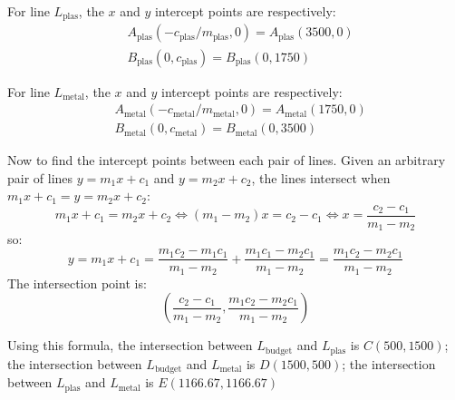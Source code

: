 \documentclass{article}
\begin{document}
For line \(L_\text{plas}\), the \(x\) and \(y\) intercept points are respectively: 
\begin{align*}
& A_\text{plas}(-c_\text{plas}/m_\text{plas}, 0) = A_\text{plas}(3500, 0)\\
& B_\text{plas}(0, c_\text{plas}) = B_\text{plas}(0, 1750)
\end{align*}

For line \(L_\text{metal}\), the \(x\) and \(y\) intercept points are respectively: 
\begin{align*}
& A_\text{metal}(-c_\text{metal}/m_\text{metal}, 0) = A_\text{metal}(1750, 0)\\
& B_\text{metal}(0, c_\text{metal}) = B_\text{metal}(0, 3500)
\end{align*}

\vspace{5mm}

Now to find the intercept points between each pair of lines. Given an arbitrary pair of lines \(y = m_1x + c_1\) and \(y = m_2x + c_2\), the lines intersect when \(m_1x + c_1 = y = m_2x + c_2\):
\[m_1x + c_1 = m_2x + c_2 \iff (m_1 - m_2)x = c_2 - c_1 \iff x = \frac{c_2 - c_1}{m_1 - m_2}\]
so:
\[y = m_1x + c_1 = \frac{m_1c_2 - m_1c_1}{m_1 - m_2} + \frac{m_1c_1 - m_2c_1}{m_1 - m_2} = \frac{m_1c_2 - m_2c_1}{m_1 - m_2}\]
The intersection point is:
\[\left(\frac{c_2 - c_1}{m_1 - m_2}, \frac{m_1c_2 - m_2c_1}{m_1 - m_2}\right)\] 

Using this formula, the intersection between \(L_\text{budget}\) and \(L_\text{plas}\) is \(C(500, 1500)\); the intersection between \(L_\text{budget}\) and \(L_\text{metal}\) is \(D(1500, 500)\); the intersection between \(L_\text{plas}\) and \(L_\text{metal}\) is \(E(1166.67, 1166.67)\)
\end{document}
